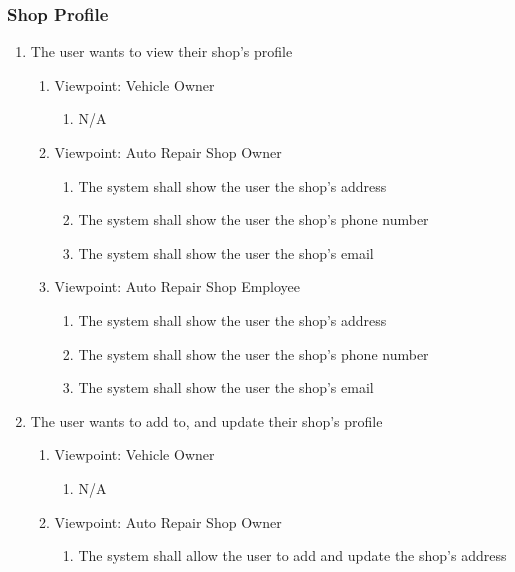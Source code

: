 \documentclass[12pt]{article}
\begin{document}
\subsubsection{Shop Profile}
\begin{enumerate}[resume*=business_events]
	\item The user wants to view their shop's profile
	      \begin{enumerate}[VP\arabic*.]
		      \item Viewpoint: Vehicle Owner
		            \begin{enumerate}
			            \item[] N/A
		            \end{enumerate}
		      \item Viewpoint: Auto Repair Shop Owner
		            \begin{enumerate}
			            \item The system shall show the user the shop's address
			            \item The system shall show the user the shop's phone number
			            \item The system shall show the user the shop's email
		            \end{enumerate}
		      \item Viewpoint: Auto Repair Shop Employee
		            \begin{enumerate}
			            \item The system shall show the user the shop's address
			            \item The system shall show the user the shop's phone number
			            \item The system shall show the user the shop's email
		            \end{enumerate}
	      \end{enumerate}
	\item The user wants to add to, and update their shop's profile
	      \begin{enumerate}[VP\arabic*.]
		      \item Viewpoint: Vehicle Owner
		            \begin{enumerate}
			            \item[] N/A
		            \end{enumerate}
		      \item Viewpoint: Auto Repair Shop Owner
		            \begin{enumerate}
			            \item The system shall allow the user to add and update the shop's address

\end{enumerate}
\end{enumerate}
\end{enumerate}
\end{document}
